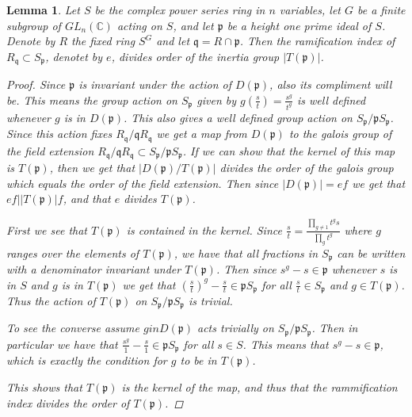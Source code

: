 \documentclass[11pt, a4paper, english]{article}
\numberwithin{prop}{section}
\newtheorem{lemma}{Lemma}
\numberwithin{lemma}{section}
\numberwithin{theorem}{section}
\numberwithin{defin}{section}
\numberwithin{example}{section}
\newcommand{\C}{\mathbb{C}}
\begin{document}
\begin{lemma}
Let $S$ be the complex power series ring in $n$ variables, let $G$ be  a finite subgroup of $GL_n(\C)$ acting on $S$, and let $\mathfrak{p}$ be a height one prime ideal of $S$. Denote by $R$ the fixed ring $S^G$ and let $\mathfrak{q} = R \cap \mathfrak{p}$. Then the ramification index of $R_\mathfrak{q} \subset S_\mathfrak{p}$, denotet by $e$, divides order of the inertia group $|T(\mathfrak{p})|$.

\begin{proof}
Since $\mathfrak{p}$ is invariant under the action of $D(\mathfrak{p})$, also its compliment will be. This means the group action on $S_\mathfrak{p}$ given by $g(\frac{s}{t}) = \frac{s^g}{t^g}$ is well defined whenever $g$ is in $D(\mathfrak{p})$. This also gives a well defined group action on $S_\mathfrak{p}/\mathfrak{p}S_\mathfrak{p}$. Since this action fixes $R_\mathfrak{q}/\mathfrak{q}R_\mathfrak{q}$ we get a map from $D(\mathfrak{p})$ to the galois group of the field extension $R_\mathfrak{q}/\mathfrak{q}R_\mathfrak{q} \subset S_\mathfrak{p}/\mathfrak{p}S_\mathfrak{p}$. If we can show that the kernel of this map is $T(\mathfrak{p})$, then we get that $|D(\mathfrak{p})/T(\mathfrak{p})|$ divides the order of the galois group which equals the order of the field extension. Then since $|D(\mathfrak{p})| = ef$ we get that $ef \Big| |T(\mathfrak{p})|f$, and that $e$ divides $T(\mathfrak{p})$.

First we see that $T(\mathfrak{p})$ is contained in the kernel. Since $\frac{s}{t} = \frac{\prod_{g \neq 1}t^g s}{\prod_g t^g}$ where $g$ ranges over the elements of $T(\mathfrak{p})$, we have that all fractions in $S_\mathfrak{p}$ can be written with a denominator invariant under $T(\mathfrak{p})$. Then since $s^g - s \in \mathfrak{p}$ whenever $s$ is in $S$ and $g$ is in $T(\mathfrak{p})$ we get that $\left(\frac{s}{t}\right)^g - \frac{s}{t} \in \mathfrak{p}S_\mathfrak{p}$ for all $\frac{s}{t} \in S_\mathfrak{p}$ and $g \in T(\mathfrak{p})$. Thus the action of $T(\mathfrak{p})$ on $S_\mathfrak{p}/\mathfrak{p}S_\mathfrak{p}$ is trivial.

To see the converse assume $g in D(\mathfrak{p})$ acts trivially on $S_\mathfrak{p}/\mathfrak{p}S_\mathfrak{p}$. Then in particular we have that $\frac{s^g}{1} - \frac{s}{1} \in \mathfrak{p}S_\mathfrak{p}$ for all $s \in S$. This means that $s^g - s \in \mathfrak{p}$, which is exactly the condition for $g$ to be in $T(\mathfrak{p})$.

This shows that $T(\mathfrak{p})$ is the kernel of the map, and thus that the rammification index divides the order of $T(\mathfrak{p})$. 
\end{proof}
\end{lemma}
\end{document}
